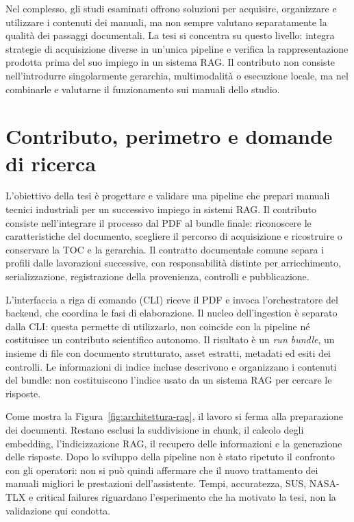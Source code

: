 Nel complesso, gli studi esaminati offrono soluzioni per acquisire, organizzare e utilizzare i contenuti dei manuali, ma non sempre valutano separatamente la qualità dei passaggi documentali. La tesi si concentra su questo livello: integra strategie di acquisizione diverse in un'unica pipeline e verifica la rappresentazione prodotta prima del suo impiego in un sistema RAG. Il contributo non consiste nell'introdurre singolarmente gerarchia, multimodalità o esecuzione locale, ma nel combinarle e valutarne il funzionamento sui manuali dello studio.

\section{Contributo, perimetro e domande di ricerca}
\label{sec:posizionamento}
\label{sec:obiettivo}

L'obiettivo della tesi è progettare e validare una pipeline che prepari manuali tecnici industriali per un successivo impiego in sistemi RAG. Il contributo consiste nell'integrare il processo dal PDF al bundle finale: riconoscere le caratteristiche del documento, scegliere il percorso di acquisizione e ricostruire o conservare la TOC e la gerarchia. Il contratto documentale comune separa i profili dalle lavorazioni successive, con responsabilità distinte per arricchimento, serializzazione, registrazione della provenienza, controlli e pubblicazione.

L'interfaccia a riga di comando (CLI) riceve il PDF e invoca l'orchestratore del backend, che coordina le fasi di elaborazione. Il nucleo dell'ingestion è separato dalla CLI: questa permette di utilizzarlo, non coincide con la pipeline né costituisce un contributo scientifico autonomo. Il risultato è un \emph{run bundle}, un insieme di file con documento strutturato, asset estratti, metadati ed esiti dei controlli. Le informazioni di indice incluse descrivono e organizzano i contenuti del bundle: non costituiscono l'indice usato da un sistema RAG per cercare le risposte.

Come mostra la Figura~\ref{fig:architettura-rag}, il lavoro si ferma alla preparazione dei documenti. Restano esclusi la suddivisione in chunk, il calcolo degli embedding, l'indicizzazione RAG, il recupero delle informazioni e la generazione delle risposte. Dopo lo sviluppo della pipeline non è stato ripetuto il confronto con gli operatori: non si può quindi affermare che il nuovo trattamento dei manuali migliori le prestazioni dell'assistente. Tempi, accuratezza, SUS, NASA-TLX e critical failures riguardano l'esperimento che ha motivato la tesi, non la validazione qui condotta.

